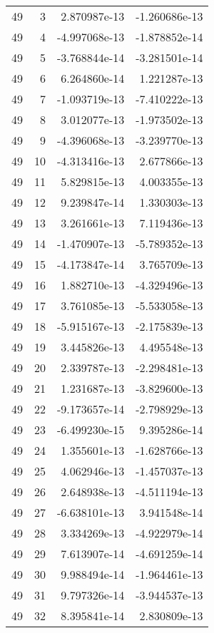 \begin{tabular}{rrrr}
  49 &    3 &  2.870987e-13 & -1.260686e-13 \\
  49 &    4 & -4.997068e-13 & -1.878852e-14 \\
  49 &    5 & -3.768844e-14 & -3.281501e-14 \\
  49 &    6 &  6.264860e-14 &  1.221287e-13 \\
  49 &    7 & -1.093719e-13 & -7.410222e-13 \\
  49 &    8 &  3.012077e-13 & -1.973502e-13 \\
  49 &    9 & -4.396068e-13 & -3.239770e-13 \\
  49 &   10 & -4.313416e-13 &  2.677866e-13 \\
  49 &   11 &  5.829815e-13 &  4.003355e-13 \\
  49 &   12 &  9.239847e-14 &  1.330303e-13 \\
  49 &   13 &  3.261661e-13 &  7.119436e-13 \\
  49 &   14 & -1.470907e-13 & -5.789352e-13 \\
  49 &   15 & -4.173847e-14 &  3.765709e-13 \\
  49 &   16 &  1.882710e-13 & -4.329496e-13 \\
  49 &   17 &  3.761085e-13 & -5.533058e-13 \\
  49 &   18 & -5.915167e-13 & -2.175839e-13 \\
  49 &   19 &  3.445826e-13 &  4.495548e-13 \\
  49 &   20 &  2.339787e-13 & -2.298481e-13 \\
  49 &   21 &  1.231687e-13 & -3.829600e-13 \\
  49 &   22 & -9.173657e-14 & -2.798929e-13 \\
  49 &   23 & -6.499230e-15 &  9.395286e-14 \\
  49 &   24 &  1.355601e-13 & -1.628766e-13 \\
  49 &   25 &  4.062946e-13 & -1.457037e-13 \\
  49 &   26 &  2.648938e-13 & -4.511194e-13 \\
  49 &   27 & -6.638101e-13 &  3.941548e-14 \\
  49 &   28 &  3.334269e-13 & -4.922979e-14 \\
  49 &   29 &  7.613907e-14 & -4.691259e-14 \\
  49 &   30 &  9.988494e-14 & -1.964461e-13 \\
  49 &   31 &  9.797326e-14 & -3.944537e-13 \\
  49 &   32 &  8.395841e-14 &  2.830809e-13 \\

\end{tabular}
